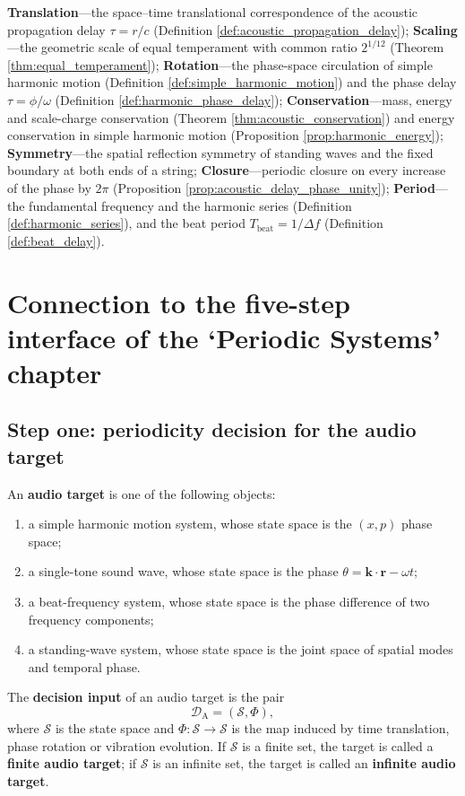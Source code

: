\begin{remark}\label{rem:audio_seven_themes}
\textbf{Translation}---the space--time translational correspondence of the acoustic propagation delay $\tau = r/c$ (Definition \ref{def:acoustic_propagation_delay}); \textbf{Scaling}---the geometric scale of equal temperament with common ratio $2^{1/12}$ (Theorem \ref{thm:equal_temperament}); \textbf{Rotation}---the phase-space circulation of simple harmonic motion (Definition \ref{def:simple_harmonic_motion}) and the phase delay $\tau = \phi/\omega$ (Definition \ref{def:harmonic_phase_delay}); \textbf{Conservation}---mass, energy and scale-charge conservation (Theorem \ref{thm:acoustic_conservation}) and energy conservation in simple harmonic motion (Proposition \ref{prop:harmonic_energy}); \textbf{Symmetry}---the spatial reflection symmetry of standing waves and the fixed boundary at both ends of a string; \textbf{Closure}---periodic closure on every increase of the phase by $2\pi$ (Proposition \ref{prop:acoustic_delay_phase_unity}); \textbf{Period}---the fundamental frequency and the harmonic series (Definition \ref{def:harmonic_series}), and the beat period $T_{\text{beat}} = 1/\Delta f$ (Definition \ref{def:beat_delay}).
\end{remark}

\section{Connection to the five-step interface of the `Periodic Systems' chapter}
\label{sec:audio_five_steps}

\subsection{Step one: periodicity decision for the audio target}

\begin{definition}\label{def:audio_target}
An \textbf{audio target} is one of the following objects:
\begin{enumerate}[label=(\roman*)]
    \item a simple harmonic motion system, whose state space is the $(x,p)$ phase space;
    \item a single-tone sound wave, whose state space is the phase $\theta=\mathbf k\cdot\mathbf r-\omega t$;
    \item a beat-frequency system, whose state space is the phase difference of two frequency components;
    \item a standing-wave system, whose state space is the joint space of spatial modes and temporal phase.
\end{enumerate}
The \textbf{decision input} of an audio target is the pair
\[
\mathcal D_{\mathrm{A}}=(\mathcal S,\Phi),
\]
where $\mathcal S$ is the state space and $\Phi:\mathcal S\to\mathcal S$ is the map induced by time translation, phase rotation or vibration evolution. If $\mathcal S$ is a finite set, the target is called a \textbf{finite audio target}; if $\mathcal S$ is an infinite set, the target is called an \textbf{infinite audio target}.
\end{definition}

